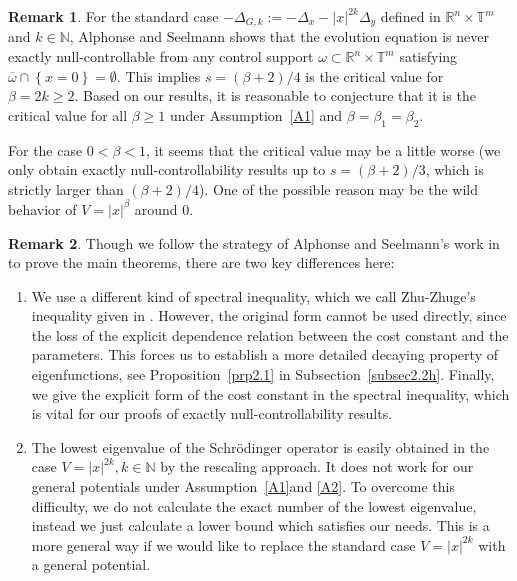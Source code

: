\documentclass{article}
\numberwithin{equation}{section}
\newcommand\N{\ensuremath{\mathbb{N}}}
\newcommand\R{\ensuremath{\mathbb{R}}}
\newcommand\T{\ensuremath{\mathbb{T}}}
\numberwithin{equation}{section}
\theoremstyle{definition}
\newtheorem{remark}{Remark}[section]
\begin{document}
\begin{remark}\label{r1h}
	For the standard case $-\Delta_{G,k}:=-\Delta_x-|x|^{2k}\Delta_y$ defined in $\R^{n}\times \T^{m}$ and $k\in \N$, Alphonse and Seelmann \cite[Theorem~2.17]{alphonse2023quantitative} shows that the evolution equation is never exactly null-controllable from any control support $\omega \subset \R^{n}\times \T^{m}$ satisfying $\overline{\omega}\cap \left\{x=0\right\} =\emptyset$. This implies $s= (\beta +2) /4$ is the critical value for $\beta=2k \ge 2$. Based on our results, it is reasonable to conjecture that it is the critical value for all  $\beta \ge 1$ under Assumption~\ref{A1} and $\beta=\beta_1=\beta_2$.


	For the case $0<\beta <1$, it seems that the critical value may be a little worse (we only obtain exactly null-controllability results up to $s=(\beta +2) /3$, which is strictly larger than $(\beta +2) /4$). One of the possible reason may be the wild behavior of $V=|x|^{\beta}$ around $0$. 
\end{remark}

\begin{remark}
	Though we follow the strategy of Alphonse and Seelmann's work in \cite{alphonse2023quantitative} to prove the main theorems, there are two key differences here:
	\begin{enumerate}
		\item We use a different kind of spectral inequality, which we call Zhu-Zhuge's inequality given in \cite[Theorem~1]{zhu2023spectral}. However, the original form cannot be used directly, since the loss of the explicit dependence relation between the cost constant and the parameters. This forces us to establish a more detailed decaying property of eigenfunctions, see Proposition~\ref{prp2.1} in Subsection~\ref{subsec2.2h}. Finally, we give the explicit form of the cost constant in the spectral inequality, which is vital for our proofs of exactly null-controllability results.
		\item The lowest eigenvalue of the Schrödinger operator is easily obtained in the case $V=|x|^{2k},k \in \N$ by the rescaling approach. It does not work for our general potentials under Assumption~\ref{A1}and \ref{A2}. To overcome this difficulty, we do not calculate the exact number of the lowest eigenvalue, instead we just calculate a lower bound which satisfies our needs. This is a more general way if we would like to replace the standard case $V=|x|^{2k}$ with a general potential.
	\end{enumerate}
\end{remark}
\end{document}
